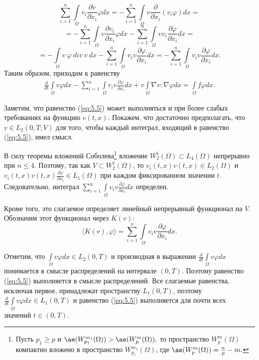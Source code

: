 $$\sum_{i=1}^{n}\int\limits_\Omega v_i\frac{\partial v}{\partial x_i}\varphi dx=-\sum_{i=1}^{n}\int\limits_\Omega v\frac{\partial}{\partial x_i}(v_i\varphi)dx=$$
$$=-\sum_{i=1}^{n}\int\limits_\Omega v\frac{\partial v_i}{\partial x_i}\varphi dx-\sum_{i=1}^{n}\int\limits_\Omega vv_i\frac{\partial\varphi}{\partial x_i} dx=$$
$$=-\int\limits_\Omega v \ \varphi \ div \ v \ dx-\sum_{i=1}^{n}\int\limits_\Omega v_i v\frac{\partial\varphi}{\partial x_i}dx=
-\sum_{i=1}^{n}\int\limits_\Omega v_i v\frac{\partial\varphi}{\partial x_i}dx.$$
Таким образом, приходим к равенству
\begin{equation}\label{eq:5.5}
    \begin{gathered}
        \frac{d}{dt}\int\limits_\Omega v \varphi dx-\sum_{i=1}^{n}\int\limits_\Omega v_i v
        \frac{\partial \varphi }{\partial x_i}dx + v\int\limits_\Omega \nabla v :\nabla\varphi dx
        =\int\limits_\Omega f\varphi dx.
    \end{gathered}
\end{equation}

Заметим, что равенство (\ref{eq:5.5}) может выполняться и при более слабых требованиях на функцию $v(t, x)$.
Покажем, что достаточно предполагать, что $v\in L_2(0, T;V)$ для того, чтобы каждый интеграл, входящий в равенство (\ref{eq:5.5}), имел смысл.

В силу теоремы вложений Соболева\footnote{Пусть $p_1\ge p$ и $\ae(W_{p_1}^{m_1}(\Omega))>\ae(W_{p}^{m}(\Omega)),$ то пространство $W_{p}^{m}(\Omega)$ компактно
вложено в пространство $W_{p_1}^{m_1}(\Omega)$, где $\ae(W_{p}^{m}(\Omega))=\frac{n}{p}-m.$} вложение $W^{1}_{2}(\Omega)\subset L_4(\Omega)$ непрерывно при $n \leqslant 4$.
Поэтому, так как $V\subset W^{1}_{2}(\Omega)$, то $v_i(t, x)v(t, x)\in L_2(\Omega)$ и $v_i(t, x)v(t, x)\frac{\partial \varphi }{\partial x_i} \in L_1(\Omega)$
при каждом фиксированном значении $t$. Следовательно, интеграл $\sum\limits_{i=1}^{n}\int\limits_\Omega v_iv \frac{\partial\varphi}{\partial x_i}dx$ определен.

Кроме того, это слагаемое определяет линейный непрерывный функционал на $V$. Обозначим этот функционал через $K(v)$:
$$\langle K(v),\varphi \rangle = \sum_{i=1}^{n}\int\limits_\Omega v_i v \frac{\partial \varphi}{\partial x_i}dx.$$

Отметим, что $\int\limits_\Omega v \varphi dx\in L_2(0, T)$ и производная в выражении \linebreak
$\frac{d}{dt}\int\limits_\Omega v \varphi dx$
понимается в смысле распределений на интервале $(0, T)$. Поэтому равенство (\ref{eq:5.5}) выполняется в смысле распределений.
Все слагаемые равенства, исключая первое, принадлежат пространству $L_1(0, T)$, поэтому $\frac{d}{dt}\int\limits_\Omega v \varphi dx\in L_1(0, T)$
и равенство (\ref{eq:5.5}) выполняется для почти всех значений $t\in (0, T)$.

